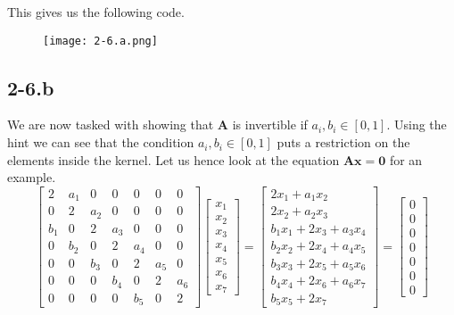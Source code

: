 \documentclass{article}
\begin{document}
\pagebreak

\noindent This gives us the following code.

\begin{figure}[!hbt]
    \centering
\texttt{[image: 2-6.a.png]}
\end{figure}

\subsection*{2-6.b}
We are now tasked with showing that $\mathbf{A}$ is invertible if $a_{i}, b_{i} \in \left[0,1\right]$. Using the hint we can see that the condition $a_{i}, b_{i} \in \left[0,1\right]$ puts a restriction on the elements inside the kernel. Let us hence look at the equation $\mathbf{A}\mathbf{x} = \mathbf{0}$ for an example.
\begin{equation*}
    \begin{bmatrix}
    2 & a_{1} & 0 & 0 & 0 & 0& 0 \\
    0 & 2 & a_{2} & 0 & 0& 0 & 0 \\
    b_{1} & 0 & 2 & a_{3} & 0 & 0& 0 \\
    0 & b_{2} & 0& 2& a_{4} & 0& 0\\
    0 & 0 &b_{3} & 0 & 2 & a_{5} & 0\\
    0 & 0 & 0 & b_{4} & 0 & 2 & a_{6} \\
    0  & 0 & 0 & 0 & b_{5} & 0 & 2
    \end{bmatrix}
    \begin{bmatrix}
        x_{1} \\ x_{2} \\ x_{3} \\ x_{4} \\ x_{5} \\ x_{6} \\ x_{7}
    \end{bmatrix} =
    \begin{bmatrix}
        2x_{1} + a_{1}x_{2} \\
        2x_{2} + a_{2}x_{3} \\
        b_{1}x_{1} + 2x_{3} + a_{3}x_{4} \\
        b_{2}x_{2} + 2x_{4} + a_{4}x_{5} \\
        b_{3}x_{3} + 2x_{5} + a_{5}x_{6} \\
        b_{4}x_{4} + 2x_{6} + a_{6}x_{7} \\
        b_{5}x_{5} + 2x_{7}
    \end{bmatrix} = \begin{bmatrix}
        0 \\ 0  \\ 0 \\ 0 \\ 0 \\ 0 \\ 0
    \end{bmatrix}
\end{equation*}
\end{document}
